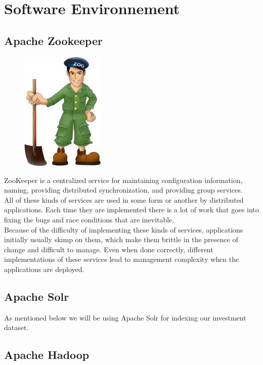 \clearpage

\section{Software Environnement}
\subsection{Apache Zookeeper}
\begin{figure}
    \includegraphics[width=4cm]{images/zookeeper.jpeg}
    \end{figure}
ZooKeeper is a centralized service for maintaining configuration information, naming, providing distributed synchronization, and providing group services. \\
All of these kinds of services are used in some form or another by distributed applications. Each time they are implemented there is a lot of work that goes into fixing the bugs and race conditions that are inevitable.\\
Because of the difficulty of implementing these kinds of services, applications initially usually skimp on them, which make them brittle in the presence of change and difficult to manage. Even when done correctly, different implementations of these services lead to management complexity when the applications are deployed.
\bigbreak
\bigbreak
\bigbreak
\bigbreak
\bigbreak
\bigbreak
\subsection{Apache Solr}
As mentioned below we will be using Apache Solr for indexing our investment dataset.
\subsection{Apache Hadoop}

